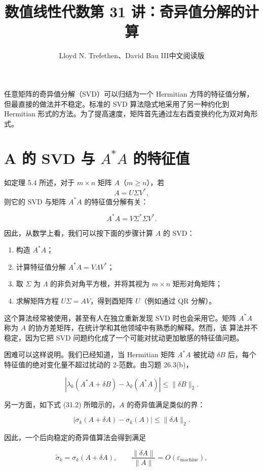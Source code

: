 \documentclass[UTF8,fontset=none,12pt]{ctexart}
\title{数值线性代数\quad 第 31 讲：奇异值分解的计算}
\author{Lloyd N. Trefethen、David Bau III\quad 中文阅读版}
\date{}
\begin{document}
\maketitle
\pagestyle{plain}

任意矩阵的奇异值分解（SVD）可以归结为一个 Hermitian 方阵的特征值分解，
但最直接的做法并不稳定。标准的 SVD 算法隐式地采用了另一种约化到 Hermitian
形式的方法。为了提高速度，矩阵首先通过左右酉变换约化为双对角形式。

\section*{A 的 SVD 与 $A^*A$ 的特征值}

如定理 5.4 所述，对于 $m\times n$ 矩阵 $A$（$m\ge n$），若
\[
A=U\Sigma V^*,
\]
则它的 SVD 与矩阵 $A^*A$ 的特征值分解有关：

\[
A^*A=V\Sigma^*\Sigma V^*.
\]

因此，从数学上看，我们可以按下面的步骤计算 $A$ 的 SVD：

\begin{enumerate}[label=\arabic*.]
\item 构造 $A^*A$；
\item 计算特征值分解 $A^*A=V\Lambda V^*$；
\item 取 $\Sigma$ 为 $\Lambda$ 的非负对角平方根，并将其视为 $m\times n$ 矩形对角矩阵；
\item 求解矩阵方程 $U\Sigma=AV$，得到酉矩阵 $U$（例如通过 QR 分解）。
\end{enumerate}

这个算法经常被使用，甚至有人在独立重新发现 SVD 时也会采用它。矩阵
$A^*A$ 称为 $A$ 的协方差矩阵，在统计学和其他领域中有熟悉的解释。然而，该
算法并不稳定，因为它把 SVD 问题约化成了一个可能对扰动更加敏感的特征值问题。

困难可以这样说明。我们已经知道，当 Hermitian 矩阵 $A^*A$ 被扰动
$\delta B$ 后，每个特征值的绝对变化量不超过扰动的 2-范数。由习题 26.3(b)，

$$
|\lambda_k(A^*A+\delta B)-\lambda_k(A^*A)|
\le \|\delta B\|_2.
$$

另一方面，如下式 (31.2) 所暗示的，$A$ 的奇异值满足类似的界：

$$
|\sigma_k(A+\delta A)-\sigma_k(A)|\le \|\delta A\|_2.
$$

因此，一个后向稳定的奇异值算法会得到满足

\begin{equation}
\widetilde\sigma_k=\sigma_k(A+\delta A),
\qquad
\frac{\|\delta A\|}{\|A\|}=O(\varepsilon_{\mathrm{machine}}),
\tag{31.1}
\end{equation}
\end{document}
